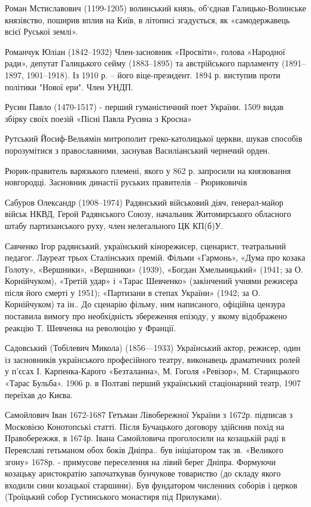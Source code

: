 Роман Мстиславович (1199-1205) волинський князь, об‘єднав Галицько-Волинське князівство, поширив вплив на Київ, в літописі згадується, як «самодержавець всієї Руської землі».

Романчук Юліан  (1842–1932) Член-засновник «Просвіти», голова «Народної ради», депутат Галицького сейму (1883–1895) та австрійського парламенту (1891–1897, 1901–1918). Із 1910 р. – його віце-президент. 1894 р. виступив проти політики "Нової ери". Член УНДП.

Русин Павло (1470-1517)   - перший гуманістичний поет України. 1509 видав збірку своїх поезій «Пісні Павла Русина з Кросна» 

Рутський Йосиф-Вельямін  митрополит греко-католицької церкви, шукав способів порозумітися з православними, заснував Василіанський чернечий орден.

Рюрик-правитель варязького племені, якого у 862 р. запросили на князювання новгородці. Засновник династії руських правителів – Рюриковичів

Сабуров Олександр (1908–1974) Радянський військовий діяч, генерал-майор військ НКВД, Герой Радянського Союзу, начальник Житомирсь­кого обласного штабу партизанського руху, член нелегального ЦК КП(б)У.

Савченко Ігор радянський, український кінорежисер, сценарист, театральний педагог.  Лауреат трьох Сталінських премій. Фільми «Гармонь», «Дума про козака Голоту», «Вершники», «Вершники» (1939), «Богдан Хмельницький» (1941; за О. Корнійчуком), «Третій удар» і «Тарас Шевченко» (закінчений учнями режисера після його смерті у 1951); «Партизани в степах України» (1942; за О. Корнійчуком) та ін.. До сценарію фільму, ним написаного, офіційна цензура поставила вимогу про необхідність збереження епізоду, у якому відображено реакцію Т. Шевченка на революцію у Франції. 

Садовський (Тобілевич Микола) (1856—1933) Український актор, режисер, один із засновників українського професійного театру, виконавець драматичних ролей у п’єсах І. Карпенка-Карого «Безталанна», М. Гоголя «Ревізор», М. Старицького «Тарас Бульба». 1906 р. в Полтаві перший український стаціонарний театр, 1907 переїхав до Києва.

Самойлович Іван  1672-1687 Гетьман Лівобережної України з 1672р. підписав з Московією Конотопські статті. Після Бучацького договору здійснив похід на Правобережжя, в 1674р. Івана Самойловича проголосили на козацькій раді в Переяславі гетьманом обох боків Дніпра.. був ініціатором так зв. «Великого згону» 1678р. - примусове переселення на лівий берег Дніпра. Формуючи козацьку аристократію започаткував бунчукове товариство (до складу якого входили сини козацької старшини). Був фундатором численних соборів і церков (Троїцький собор Густинського монастиря під Прилуками).

